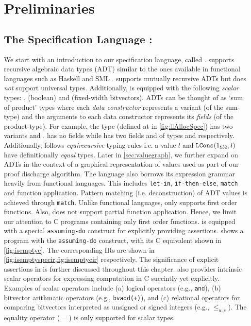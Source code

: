 \chapter{Preliminaries}
\label{sec:prelims}


\section{The Specification Language : \SpecL{}}
\label{sec:speclang}
We start with an introduction to our specification language, called \SpecL{}.
\SpecL{} supports recursive algebraic data types (ADT) \cite{algebraicdatatypes} similar to the
ones available in functional languages such as Haskell \cite{marlow2010haskell} and SML \cite{standardmlspec}.
\SpecL{} supports mutually recursive ADTs but does {\em not} support universal types.
Additionally, \SpecL{} is equipped with the following {\em scalar} types: ,  (boolean) and  (fixed-width bitvectors).
ADTs can be thought of as `sum of product' types where each {\em data constructor} represents a variant (of the sum-type)
and the arguments to each data constructor represents its {\em fields} (of the product-type).
For example, the  type (defined at  in \cref{fig:llAllocSpec}) has two variants  and .
 has no fields while  has two fields  and  of types  and  respectively.
Additionally, \SpecL{} follows {\em equirecursive} typing rules i.e.
a  value $l$ and ${\tt LCons}(1_{\tt i32}, l)$ have definitionally {\em equal} types.
Later in \cref{sec:valuegraph}, we further expand on ADTs in the context of a
graphical representation of values used as part of our proof discharge algorithm.
The language also borrows its expression grammar heavily from functional languages.
This includes {\tt let-in}, {\tt if-then-else}, {\tt match} and function application.
Pattern matching (i.e. deconstruction) of ADT values is achieved through {\tt match}.
Unlike functional languages, \SpecL{} only supports first order functions.
Also, \SpecL{} does not support partial function application.
Hence, we limit our attention to C programs containing only first order functions.
\SpecL{} is equipped with a special {\tt assuming-do} construct for explicitly providing assertions.
 shows a \SpecL{} program with the {\tt assuming-do} construct, with its C equivalent
shown in \cref{fig:isemptyc}.
The corresponding IRs are shown in \cref{fig:isemptyspecir,fig:isemptycir} respectively.
The significance of explicit assertions in \SpecL{} is further discussed throughout this chapter.
\SpecL{} also provides intrinsic scalar operators for expressing computation in C succintly yet explicitly.
Examples of scalar operators include (a) logical operators (e.g., {\tt and}), (b) bitvector arithmatic operators (e.g., {\tt bvadd(+)}),
and (c) relational operators for comparing bitvectors interpreted as unsigned or signed integers (e.g., $\leq_{u,s}$).
The equality operator ($=$) is only supported for scalar types.

